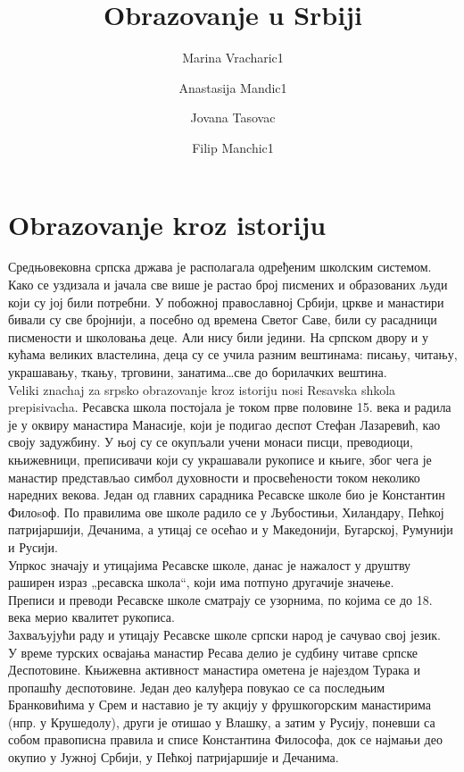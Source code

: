 \documentclass[12pt,twoside]{article}
\title{Obrazovanje u Srbiji}
\author{Marina Vracharic1\and Anastasija Mandic1\and Jovana Tasovac\and Filip Manchic1}
\newcommand{\cirilica}[1]{{\fontencoding{OT2}{\selectfont{#1}}}}
\begin{document}
\maketitle
    \renewcommand\contentsname{Sadrzhaj}
    \tableofcontents{}
    \thispagestyle{empty}
    \clearpage
    \thispagestyle{empty}
     \cleardoublepage
    
  
    
    \renewcommand\bibname{\cirilica{Literatura}}
    \nocite{*}
    
    
  \section{Obrazovanje kroz istoriju}
  Средњовековна српска држава је располагала одређеним школским системом. Како се уздизала и јачала све више је растао број писмених и образованих људи који су јој били потребни. У побожној православној Србији, цркве и манастири бивали су све бројнији, а посебно од времена Светог Саве, били су расадници писмености и школовања деце. Али нису били једини. На српском двору и у кућама великих властелина, деца су се учила разним вештинама: писању, читању, украшавању, ткању, трговини, занатима…све до борилачких вештина.
  \\Veliki znachaj za srpsko obrazovanje kroz istoriju nosi Resavska shkola prepisivacha. Ресавска школа постојала је током прве половине 15. века и радила је у оквиру манастира Манасије, који је подигао деспот Стефан Лазаревић, као своју задужбину. У њој су се окупљали учени монаси писци, преводиоци, књижевници, преписивачи који су украшавали рукописе и књиге, због чега је манастир представљао симбол духовности и просвећености током неколико наредних векова. Један од главних сарадника Ресавске школе био је Константин Филоsоф. По правилима ове школе радило се у Љубостињи, Хиландару, Пећкој патријаршији, Дечанима, а утицај се осећао и у Македонији, Бугарској, Румунији и Русији. \\Упркос значају и утицајима Ресавске школе, данас је нажалост у друштву раширен израз „ресавска школа“, који има потпуно другачије значење.\\ Преписи и преводи Ресавске школе сматрају се узорнима, по којима се до 18. века мерио квалитет рукописа.\\ Захваљујући раду и утицају Ресавске школе српски народ је сачувао свој језик. \\ У време турских освајања манастир Ресава делио је судбину читаве српске Деспотовине. Књижевна активност манастира ометена је најездом Турака и пропашћу деспотовине. Један део калуђера повукао се са последњим Бранковићима у Срем и наставио је ту акцију у фрушкогорским манастирима (нпр. у Крушедолу), други је отишао у Влашку, а затим у Русију, поневши са собом правописна правила и списе Константина Философа, док се најмањи део окупио у Јужној Србији, у Пећкој патријаршије и Дечанима.\\
\end{document}
